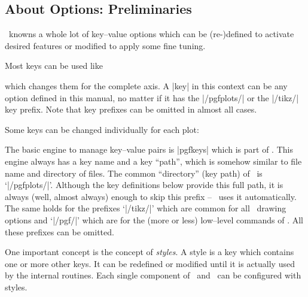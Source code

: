 
\subsection{About Options: Preliminaries}
\PGFPlots\ knowns a whole lot of key--value options which can be (re-)defined to activate desired features or modified to apply some fine tuning.

\noindent Most keys can be used like
\begin{codeexample}
\end{codeexample}
\noindent which changes them for the complete axis. A |key| in this context can be any option defined in this manual, no matter if it has the |/pgfplots/| or the |/tikz/| key prefix. Note that key prefixes can be omitted in almost all cases.

Some keys can be changed individually for each plot:
\begin{codeexample}
\end{codeexample}

The basic engine to manage key--value pairs is |pgfkeys| which is part of \pgfname. This engine always has a key name and a key ``path'', which is somehow similar to file name and directory of files. The common ``directory'' (key path) of \PGFPlots\ is `|/pgfplots/|'. Although the key definitions below provide this full path, it is always (well, almost always) enough to skip this prefix -- \PGFPlots\ uses it automatically. The same holds for the prefixes `|/tikz/|' which are common for all \Tikz\ drawing options and `|/pgf/|' which are for the (more or less) low--level commands of \pgfname. All these prefixes can be omitted.

One important concept is the concept of \emph{styles}. A style is a key which contains one or more other keys. It can be redefined or modified until it is actually used by the internal routines. Each single component of \Tikz\ and \PGFPlots\ can be configured with styles.

